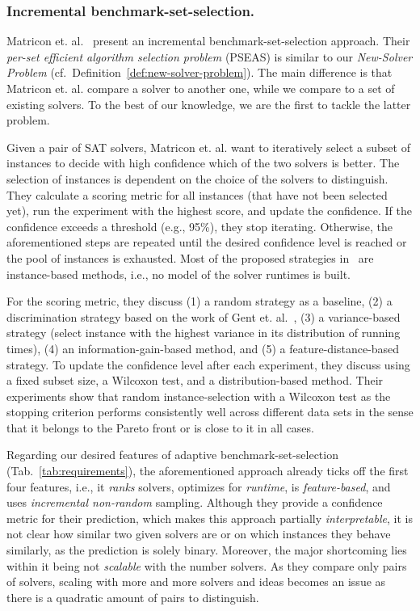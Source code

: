 \documentclass[runningheads]{llncs}
\begin{document}
\subsubsection{Incremental benchmark-set-selection.}
Matricon et. al.~\cite{MatriconAFSH21} present an incremental benchmark-set-selection approach.
Their \emph{per-set efficient algorithm selection problem} (PSEAS) is similar to our \emph{New-Solver Problem} (cf.~Definition~\ref{def:new-solver-problem}).
The main difference is that Matricon et. al. compare a solver to another one, while we compare to a set of existing solvers.
To the best of our knowledge, we are the first to tackle the latter problem.

Given a pair of SAT solvers, Matricon et. al. want to iteratively select a subset of instances to decide with high confidence which of the two solvers is better.
The selection of instances is dependent on the choice of the solvers to distinguish.
They calculate a scoring metric for all instances (that have not been selected yet), run the experiment with the highest score, and update the confidence.
If the confidence exceeds a threshold (e.g., 95\%), they stop iterating.
Otherwise, the aforementioned steps are repeated until the desired confidence level is reached or the pool of instances is exhausted.
Most of the proposed strategies in~\cite{MatriconAFSH21} are instance-based methods, i.e., no model of the solver runtimes is built.

For the scoring metric, they discuss (1) a random strategy as a baseline, (2) a discrimination strategy based on the work of Gent et. al.~\cite{GentHJKMNN14}, (3) a variance-based strategy (select instance with the highest variance in its distribution of running times), (4) an information-gain-based method, and (5) a feature-distance-based strategy.
To update the confidence level after each experiment, they discuss using a fixed subset size, a Wilcoxon test, and a distribution-based method.
Their experiments show that random instance-selection with a Wilcoxon test as the stopping criterion performs consistently well across different data sets in the sense that it belongs to the Pareto front or is close to it in all cases.

Regarding our desired features of adaptive benchmark-set-selection (Tab.~\ref{tab:requirements}), the aforementioned approach already ticks off the first four features, i.e., it \emph{ranks} solvers, optimizes for \emph{runtime}, is \emph{feature-based}, and uses \emph{incremental non-random} sampling.
Although they provide a confidence metric for their prediction, which makes this approach partially \emph{interpretable}, it is not clear how similar two given solvers are or on which instances they behave similarly, as the prediction is solely binary.
Moreover, the major shortcoming lies within it being not \emph{scalable} with the number solvers.
As they compare only pairs of solvers, scaling with more and more solvers and ideas becomes an issue as there is a quadratic amount of pairs to distinguish.
\end{document}
